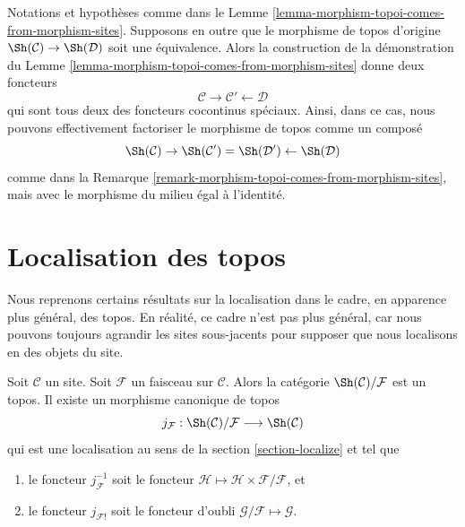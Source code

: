 \begin{remark}
\label{remark-equivalence-topoi-comes-from-morphism-sites}
Notations et hypothèses
comme dans le Lemme \ref{lemma-morphism-topoi-comes-from-morphism-sites}.
Supposons en outre que le morphisme de topos d’origine
$\Sh(\mathcal{C}) \to \Sh(\mathcal{D})$ soit une équivalence.
Alors la construction de la démonstration du
Lemme \ref{lemma-morphism-topoi-comes-from-morphism-sites}
donne deux foncteurs
$$
\mathcal{C} \rightarrow \mathcal{C}' \leftarrow \mathcal{D}
$$
qui sont tous deux des foncteurs cocontinus spéciaux.
Ainsi, dans ce cas, nous pouvons effectivement
factoriser le morphisme de topos comme un composé
$$
\Sh(\mathcal{C}) \rightarrow
\Sh(\mathcal{C}') =
\Sh(\mathcal{D}') \leftarrow
\Sh(\mathcal{D})
$$
comme dans la Remarque \ref{remark-morphism-topoi-comes-from-morphism-sites}, mais
avec le morphisme du milieu égal à l’identité.
\end{remark}








\section{Localisation des topos}
\label{section-localize-topoi}

\noindent
Nous reprenons certains résultats sur la localisation dans le cadre, en
apparence plus général, des topos. En réalité, ce cadre n’est pas plus général,
car nous pouvons toujours agrandir les sites sous-jacents pour supposer que
nous localisons en des objets du site.

\begin{lemma}
\label{lemma-localize-topos}
Soit $\mathcal{C}$ un site.
Soit $\mathcal{F}$ un faisceau sur $\mathcal{C}$.
Alors la catégorie $\Sh(\mathcal{C})/\mathcal{F}$ est un topos. Il existe un
morphisme canonique de topos
$$
j_\mathcal{F} :
\Sh(\mathcal{C})/\mathcal{F}
\longrightarrow
\Sh(\mathcal{C})
$$
qui est une localisation au sens de la section \ref{section-localize} et tel
que
\begin{enumerate}
\item le foncteur $j_\mathcal{F}^{-1}$ soit le foncteur
$\mathcal{H} \mapsto \mathcal{H} \times \mathcal{F}/\mathcal{F}$, et
\item le foncteur $j_{\mathcal{F}!}$ soit le foncteur d’oubli
$\mathcal{G}/\mathcal{F} \mapsto \mathcal{G}$.
\end{enumerate}
\end{lemma}

